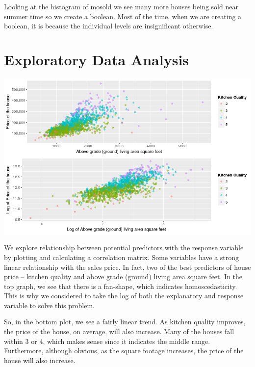 \documentclass[12pt]{article}
\begin{document}
\begin{flushleft}
Looking at the histogram of mosold we see many more houses being sold near summer time so we create a boolean. Most of the time, when we are creating a boolean, it is because the individual levels are insignificant otherwise.

\centering
\section{Exploratory Data Analysis}
    \vspace*{0.5 cm}
    \includegraphics[scale = 0.75]{plot1.png}

\begin{flushleft}
We explore relationship between potential predictors with the response variable by plotting and calculating a correlation matrix. Some variables have a strong linear relationship with the sales price. In fact, two of the best predictors of house price -- kitchen quality and above grade (ground) living area square feet. In the top graph, we see that there is a fan-shape, which indicates homoscedasticity. This is why we considered to take the log of both the explanatory and response variable to solve this problem. 

So, in the bottom plot, we see a fairly linear trend. As kitchen quality improves, the price of the house, on average, will also increase. Many of the houses fall within 3 or 4, which makes sense since it indicates the middle range. Furthermore, although obvious, as the square footage increases, the price of the house will also increase.
\end{flushleft}


\end{flushleft}
\end{document}
